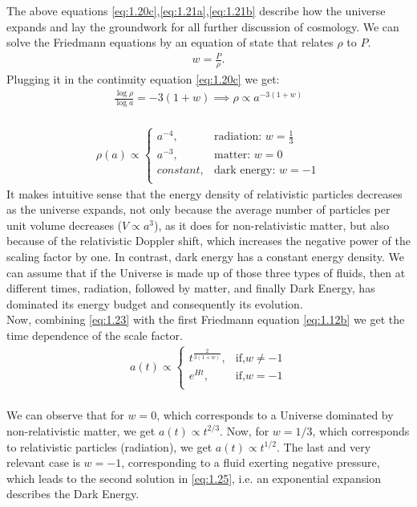 \hspace{0.5cm}The above equations \ref{eq:1.20c},\ref{eq:1.21a},\ref{eq:1.21b} describe how the universe expands and lay the groundwork for all further discussion of cosmology.
We can solve the Friedmann equations by an equation of state that relates $\rho$ to $P$. 
\begin{align}
    w = \frac{P}{\rho} . 
\end{align}
Plugging it in the continuity equation \ref{eq:1.20c} we get:
\begin{align}
    \frac{ \log \rho}{ \log a} = {-3(1 + w)} \implies \rho \propto a^{-3(1 + w)}\label{eq:1.23} 
\end{align}\\

\begin{align}
    \rho(a) \propto 
    \begin{cases}
        a^{-4} ,& \text{radiation: }  w =\frac{1}{3}\\
        a^{-3},              & \text{matter: }  w = 0\\
        constant,              & \text{dark energy: }  w = -1\\
    \end{cases}\label{eq:1.24}
\end{align}
It makes intuitive sense that the energy density of relativistic particles decreases as the universe expands, not only because the average number of particles per unit volume decreases ($V \propto a^3$), as it does for non-relativistic matter, but also because of the relativistic Doppler shift, which increases the negative power of the scaling factor by one. 
In contrast, dark energy has a constant energy density. 
We can assume that if the Universe is made up of those three types of fluids, then at different times, radiation, followed by matter, and finally Dark Energy, has dominated its energy budget and consequently its evolution.\\
Now, combining \ref{eq:1.23} with the first Friedmann equation \ref{eq:1.12b} we get the time dependence of the scale factor.
\begin{align}
    a(t) \propto 
    \begin{cases}
        t^{\frac{2}{3(1+w)}} ,& \text{if,}  w\neq -1\\
        e^{Ht},               & \text{if,}  w = -1\\
    \end{cases}\label{eq:1.25}
\end{align}\\
We can observe that for $w = 0$, which corresponds to a Universe dominated by non-relativistic matter, we get $a(t) \propto  t^{2/3}$. 
Now, for $w = 1/3$, which corresponds to relativistic particles (radiation), we get $a(t) \propto  t^{1/2}$. 
The last and very relevant case is $w = -1$, corresponding to a fluid exerting negative pressure, which leads to the second solution in \ref{eq:1.25}, i.e. an exponential expansion describes the Dark Energy.





